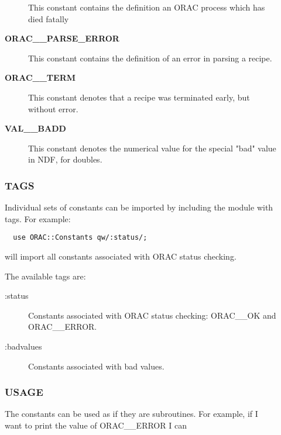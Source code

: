 \begin{description}
\begin{description}
This constant contains the definition an ORAC process which has died fatally


\item[{\textbf{ORAC\_\_PARSE\_ERROR}}] \mbox{}

This constant contains the definition of an error in parsing a recipe.


\item[{\textbf{ORAC\_\_TERM}}] \mbox{}

This constant denotes that a recipe was terminated early, but without
error.


\item[{\textbf{VAL\_\_BADD}}] \mbox{}

This constant denotes the numerical value for the special "bad" value
in NDF, for doubles.

\end{description}
\subsubsection*{TAGS\label{ORAC::Constants_TAGS}}


Individual sets of constants can be imported by
including the module with tags. For example:

\begin{verbatim}
  use ORAC::Constants qw/:status/;
\end{verbatim}


will import all constants associated with ORAC status checking.



The available tags are:

\begin{description}

\item[{:status}] \mbox{}

Constants associated with ORAC status checking: ORAC\_\_OK and ORAC\_\_ERROR.


\item[{:badvalues}] \mbox{}

Constants associated with bad values.

\end{description}
\subsubsection*{USAGE\label{ORAC::Constants_USAGE}}


The constants can be used as if they are subroutines.
For example, if I want to print the value of ORAC\_\_ERROR I can


\end{description}
